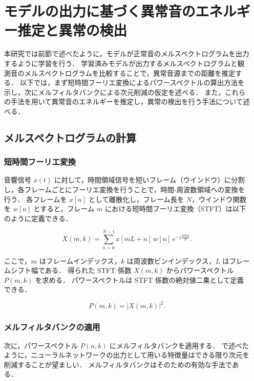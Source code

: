 \documentclass[../main]{subfiles}
\begin{document}
\section{モデルの出力に基づく異常音のエネルギー推定と異常の検出}
\label{sec:pmethod_distance_estimation}

本研究では前節で述べたように，モデルが正常音のメルスペクトログラムを出力するように学習を行う．
学習済みモデルが出力するメルスペクトログラムと観測音のメルスペクトログラムを比較することで，異常音源までの距離を推定する．
以下では，まず短時間フーリエ変換によるパワースペクトルの算出方法を示し，次にメルフィルタバンクによる次元削減の仮定を述べる．
また，これらの手法を用いて異常音のエネルギーを推定し，異常の検出を行う手法について述べる．

\subsection{メルスペクトログラムの計算}

\subsubsection{短時間フーリエ変換}
音響信号 $x(t)$ に対して，時間領域信号を短いフレーム（ウインドウ）に分割し，各フレームごとにフーリエ変換を行うことで，時間-周波数領域への変換を行う．
各フレームを $x[n]$ として離散化し，フレーム長を $N$，ウインドウ関数を $w[n]$ とすると，フレーム $m$ における短時間フーリエ変換（STFT）は以下のように定義できる．

\begin{equation}
X(m, k) = \sum_{n=0}^{N-1} x[mL + n]\, w[n]\, e^{-j \frac{2\pi k n}{N}}.
\end{equation}

ここで，$m$ はフレームインデックス，$k$ は周波数ビンインデックス，$L$ はフレームシフト幅である．
得られた STFT 係数 $X(m, k)$ からパワースペクトル $P(m, k)$ を求める．
パワースペクトルは STFT 係数の絶対値二乗として定義できる．

\begin{equation}
P(m, k) = |X(m, k)|^2.
\end{equation}

\subsubsection{メルフィルタバンクの適用}
次に，パワースペクトル \(P(n, k)\) にメルフィルタバンクを適用する．
 で述べたように，ニューラルネットワークの出力として用いる特徴量はできる限り次元を削減することが望ましい．
メルフィルタバンクはそのための有効な手法である．
\end{document}
